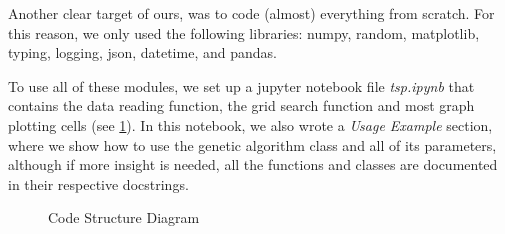 \documentclass[11pt]{article}
\begin{document}
Another clear target of ours, was to code (almost) everything from scratch. For this reason, we only used the following libraries: numpy, random, matplotlib, typing, logging, json, datetime, and pandas.

To use all of these modules, we set up a jupyter notebook file \textit{tsp.ipynb} that contains the data reading function, the grid search function and most graph plotting cells (see \ref{fig:code_structure}). In this notebook, we also wrote a \textit{Usage Example} section, where we show how to use the genetic algorithm class and all of its parameters, although if more insight is needed, all the functions and classes are documented in their respective docstrings.

\begin{figure}
    \centering
    \caption{Code Structure Diagram}
    \label{fig:code_structure}
\end{figure}
\end{document}
